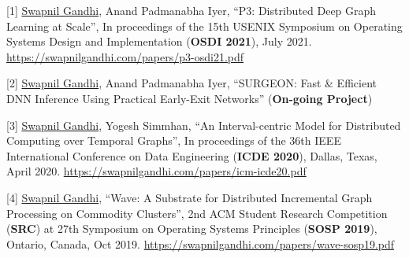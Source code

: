 \documentclass{article}
\begin{document}
[1] \underline{Swapnil Gandhi}, Anand Padmanabha Iyer, ``P3: Distributed Deep Graph Learning at Scale'', In proceedings of the 15th USENIX Symposium on Operating Systems Design and Implementation
(\textbf{OSDI 2021}), July 2021. \url{https://swapnilgandhi.com/papers/p3-osdi21.pdf}

[2] \underline{Swapnil Gandhi}, Anand Padmanabha Iyer, ``SURGEON: Fast \& Efficient DNN Inference Using Practical Early-Exit Networks'' (\textbf{On-going Project})

[3] \underline{Swapnil Gandhi}, Yogesh Simmhan, ``An Interval-centric Model for Distributed Computing over Temporal Graphs'', In proceedings of the 36th IEEE International Conference on Data Engineering
(\textbf{ICDE 2020}), Dallas, Texas, April 2020. \url{https://swapnilgandhi.com/papers/icm-icde20.pdf}

[4] \underline{Swapnil Gandhi}, ``Wave: A Substrate for Distributed Incremental Graph Processing on Commodity Clusters'', 2nd ACM Student Research Competition (\textbf{SRC}) at 27th Symposium on Operating Systems Principles (\textbf{SOSP 2019}), Ontario, Canada, Oct 2019. \url{https://swapnilgandhi.com/papers/wave-sosp19.pdf}
\end{document}
